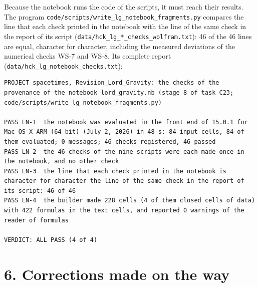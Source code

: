 \documentclass[
  10pt,
]{article}
\begin{document}
Because the notebook runs the code of the scripts, it must reach their
results. The program
\texttt{code/scripts/write\_lg\_notebook\_fragments.py} compares the
line that each check printed in the notebook with the line of the same
check in the report of its script
(\texttt{data/hck\_lg\_*\_checks\_wolfram.txt}): 46 of the 46 lines are
equal, character for character, including the measured deviations of the
numerical checks WS-7 and WS-8. Its complete report
(\texttt{data/hck\_lg\_notebook\_checks.txt}):

\begin{verbatim}
PROJECT spacetimes, Revision_Lord_Gravity: the checks of the provenance of the notebook lord_gravity.nb (stage 8 of task C23; code/scripts/write_lg_notebook_fragments.py)

PASS LN-1  the notebook was evaluated in the front end of 15.0.1 for Mac OS X ARM (64-bit) (July 2, 2026) in 48 s: 84 input cells, 84 of them evaluated; 0 messages; 46 checks registered, 46 passed
PASS LN-2  the 46 checks of the nine scripts were each made once in the notebook, and no other check
PASS LN-3  the line that each check printed in the notebook is character for character the line of the same check in the report of its script: 46 of 46
PASS LN-4  the builder made 228 cells (4 of them closed cells of data) with 422 formulas in the text cells, and reported 0 warnings of the reader of formulas

VERDICT: ALL PASS (4 of 4)
\end{verbatim}

\hypertarget{corrections-made-on-the-way}{%
\section{6. Corrections made on the
way}\label{corrections-made-on-the-way}}
\end{document}
